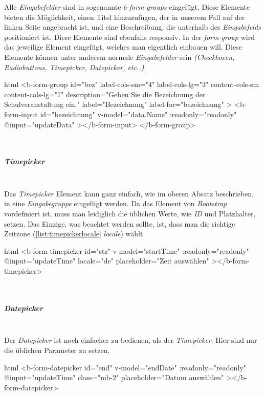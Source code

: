 Alle \textit{Eingabefelder} sind in sogenannte \textit{b-form-groups} eingefügt. Diese Elemente bieten die Möglichkeit, einen Titel hinzuzufügen, der in unserem Fall auf der linken Seite angebracht ist, und eine Beschreibung, die unterhalb des \textit{Eingabefelds} positioniert ist. Diese Elemente sind ebenfalls responsiv. In der \textit{form-group} wird das jeweilige Element eingefügt, welches man eigentlich einbauen will. Diese Elemente können unter anderem normale \textit{Eingabefelder} sein \textit{(Checkboxen, Radiobuttons, Timepicker, Datepicker, etc..)}.
\begin{code}{html}
	<b-form-group
        id="bez"
        label-cols-sm="4"
        label-cols-lg="3"
        content-cols-sm
        content-cols-lg="7"
        description="Geben Sie die Bezeichnung der Schulveranstaltung ein."
        label="Bezeichnung"
        label-for="bezeichnung"
    >
        <b-form-input
            id="bezeichnung"
            v-model="data.Name"
            :readonly="readonly"
            @input="updateData"
        ></b-form-input>
    </b-form-group>
\end{code}
~\\
\subparagraph{Timepicker}~\\
Das \textit{Timepicker} Element kann ganz einfach, wie im oberen Absatz beschrieben, in eine \textit{Eingabegruppe} eingefügt werden. Da das Element von \textit{Bootstrap} vordefiniert ist, muss man leidiglich die üblichen Werte, wie \textit{ID} und Platzhalter, setzen. Das Einzige, was beachtet werden sollte, ist, dass man die richtige Zeitzone (\autoref{list:timepickerlocale} \textit{locale}) wählt.
\begin{code}{html}
	<b-form-timepicker
		id="stz"
		v-model="startTime"
		:readonly="readonly"
		@input="updateTime"
		locale="de"
		placeholder="Zeit auswählen"
  	></b-form-timepicker>
\end{code}
\label{list:timepickerlocale}
~\\
\subparagraph{Datepicker}~\\
Der \textit{Datepicker} ist noch einfacher zu bedienen, als der \textit{Timepicker}. Hier sind nur die üblichen Parameter zu setzen.
\begin{code}{html}
	<b-form-datepicker
		id="end"
		v-model="endDate"
		:readonly="readonly"
		@input="updateTime"
		class="mb-2"
		placeholder="Datum auswählen"
  	></b-form-datepicker>
\end{code}
